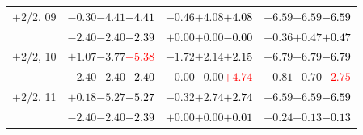 \documentclass[compress]{beamer}
\begin{document}
\begin{frame}
\begin{tabular}{r | c | c | c}
$+$2/2, 09 & $-0.30$\hspace{0.1 cm}$-4.41$\hspace{0.1 cm}\textcolor{black}{$-4.41$} & $-0.46$\hspace{0.1 cm}$+4.08$\hspace{0.1 cm}\textcolor{black}{$+4.08$} & $-6.59$\hspace{0.1 cm}$-6.59$\hspace{0.1 cm}\textcolor{black}{$-6.59$} \\
           & $-2.40$\hspace{0.1 cm}$-2.40$\hspace{0.1 cm}\textcolor{black}{$-2.39$} & $+0.00$\hspace{0.1 cm}$+0.00$\hspace{0.1 cm}\textcolor{black}{$-0.00$} & $+0.36$\hspace{0.1 cm}$+0.47$\hspace{0.1 cm}\textcolor{black}{$+0.47$} \\
$+$2/2, 10 & $+1.07$\hspace{0.1 cm}$-3.77$\hspace{0.1 cm}\textcolor{red}{$-5.38$} & $-1.72$\hspace{0.1 cm}$+2.14$\hspace{0.1 cm}\textcolor{black}{$+2.15$} & $-6.79$\hspace{0.1 cm}$-6.79$\hspace{0.1 cm}\textcolor{black}{$-6.79$} \\
           & $-2.40$\hspace{0.1 cm}$-2.40$\hspace{0.1 cm}\textcolor{black}{$-2.40$} & $-0.00$\hspace{0.1 cm}$-0.00$\hspace{0.1 cm}\textcolor{red}{$+4.74$} & $-0.81$\hspace{0.1 cm}$-0.70$\hspace{0.1 cm}\textcolor{red}{$-2.75$} \\
$+$2/2, 11 & $+0.18$\hspace{0.1 cm}$-5.27$\hspace{0.1 cm}\textcolor{black}{$-5.27$} & $-0.32$\hspace{0.1 cm}$+2.74$\hspace{0.1 cm}\textcolor{black}{$+2.74$} & $-6.59$\hspace{0.1 cm}$-6.59$\hspace{0.1 cm}\textcolor{black}{$-6.59$} \\
           & $-2.40$\hspace{0.1 cm}$-2.40$\hspace{0.1 cm}\textcolor{black}{$-2.39$} & $+0.00$\hspace{0.1 cm}$+0.00$\hspace{0.1 cm}\textcolor{black}{$+0.01$} & $-0.24$\hspace{0.1 cm}$-0.13$\hspace{0.1 cm}\textcolor{black}{$-0.13$} \\

\end{tabular}
\end{frame}
\end{document}
